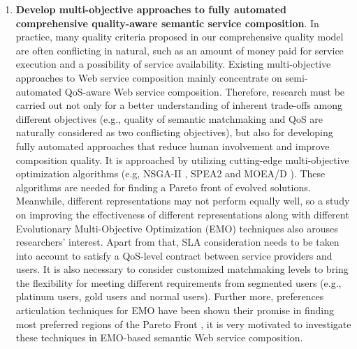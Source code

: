 \begin{enumerate}
 \item \label{Obj:2} \textbf{Develop multi-objective approaches to fully automated comprehensive quality-aware semantic service composition}. In practice, many quality criteria proposed in our comprehensive quality model are often conflicting in natural, such as an amount of money paid for service execution and a possibility of service availability. Existing multi-objective approaches \cite{chen2014partial,xiang2014qos,yin2014hybrid,liu2005dynamic,yu2013efficient,zhang2010qos} to Web service composition mainly concentrate on semi-automated QoS-aware Web service composition. Therefore, research must be carried out not only for a better understanding of inherent trade-offs among different objectives (e.g., quality of semantic matchmaking and QoS are naturally considered as two conflicting objectives), but also for developing fully automated approaches that reduce human involvement and improve composition quality. It is approached by utilizing cutting-edge multi-objective optimization algorithms (e.g, NSGA-II \cite{deb2002fast}, SPEA2 \cite{zitzler2001spea2} and MOEA/D \cite{zhang2007moea}). These algorithms are needed for finding a Pareto front of evolved solutions. Meanwhile, different representations may not perform equally well, so a study on improving the effectiveness of different representations along with different Evolutionary Multi-Objective Optimization (EMO) techniques also arouses researchers' interest. Apart from that, SLA consideration needs to be taken into account to satisfy a QoS-level contract between service providers and users. It is also necessary to consider customized matchmaking levels to bring the flexibility for meeting different requirements from segmented users (e.g., platinum users, gold users and normal users). Further more, preferences articulation techniques for EMO have been shown their promise in finding most preferred regions of the Pareto Front \cite{branke2016using,branke2005integrating,branke2001guidance,cheng2015reference,giagkiozis2014pareto}, it is very motivated to investigate these techniques in EMO-based semantic Web service composition.
 
   \begin{enumerate}
   

\end{enumerate}
\end{enumerate}
